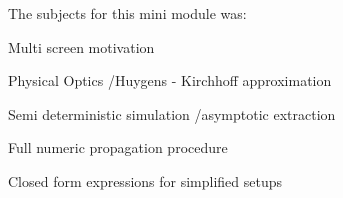 The subjects for this mini module was:
\begin{pitemize}
	\item Multi screen motivation
	\item Physical Optics /Huygens - Kirchhoff approximation
	\item Semi deterministic simulation /asymptotic extraction
	\item Full numeric propagation procedure
	\item Closed form expressions for simplified setups
\end{pitemize}




